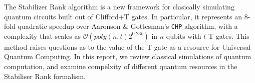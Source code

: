 \documentclass{standalone}
\begin{document}
The Stabilizer Rank algorithm is a new framework for clasically simulating quantum circuits built out of Clifford+T gates. In particular, it represents an 8-fold quadratic speedup over Aaronson \& Gottesman's \texttt{CHP} algorithm, with a complexity that scales as $\mathcal{O}(poly(n,t)2^{0.23 t})$ in $n$ qubits with $t$ T-gates. This method raises questions as to the value of the T-gate as a resource for Universal Quantum Computing. In this report, we review classical simulations of quantum computation, and examine compelxity of different quantum resources in the Stabiliser Rank formalism. 

\ifstandalone

\fi
\end{document}
